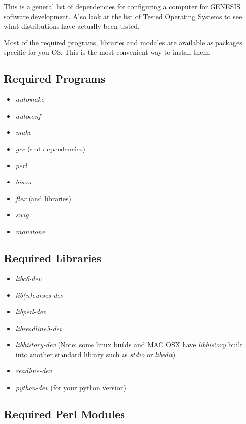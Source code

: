 \documentclass[12pt]{article}
\begin{document}
This is a general list of dependencies for configuring a computer for
GENESIS software development.  Also look at the list of \href{../tested-distributions/tested-distributions.tex}{Tested Operating Systems} to see what distributions have actually
been tested.

Most of the required programs, libraries and modules are available as
packages specific for you OS.  This is the most convenient way to install them.

\subsection*{Required Programs}

\begin{itemize}
\item {\it automake}
\item {\it autoconf}
\item {\it make}
\item {\it gcc} (and dependencies)
\item {\it perl}
\item {\it bison}
\item {\it flex} (and libraries)
\item {\it swig}
\item {\it monotone}
\end{itemize} 

\subsection*{Required Libraries}

\begin{itemize}
\item {\it libc6-dev}
\item {\it lib(n)curses-dev}
\item {\it libperl-dev}
\item {\it libreadline5-dev}
\item {\it libhistory-dev} (Note: some linux builds and MAC OSX have
  {\it libhistory} built into another standard library such as {\it
    stdio} or {\it libedit})
\item {\it readline-dev}
\item {\it python-dev} (for your python version)
\end{itemize} 

\subsection*{Required Perl Modules}
\end{document}
